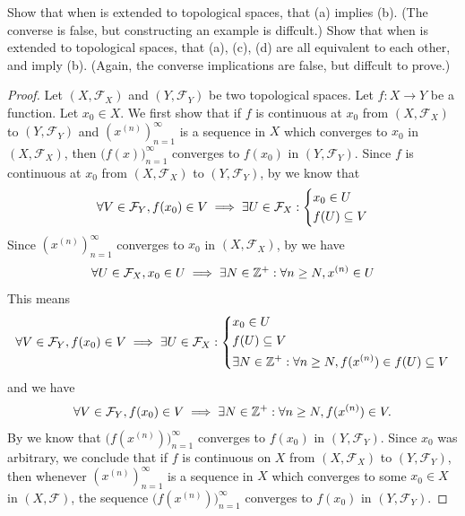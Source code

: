 \begin{ex}\label{ii:ex:2.5.16}
  Show that when  is extended to topological spaces, that (a) implies (b).
  (The converse is false, but constructing an example is diffcult.)
  Show that when  is extended to topological spaces, that (a), (c), (d) are all equivalent to each other, and imply (b).
  (Again, the converse implications are false, but diffcult to prove.)
\end{ex}

\begin{proof}
  Let \((X, \mathcal{F}_X)\) and \((Y, \mathcal{F}_Y)\) be two topological spaces.
  Let \(f : X \to Y\) be a function.
  Let \(x_0 \in X\).
  We first show that if \(f\) is continuous at \(x_0\) from \((X, \mathcal{F}_X)\) to \((Y, \mathcal{F}_Y)\) and \((x^{(n)})_{n = 1}^\infty\) is a sequence in \(X\) which converges to \(x_0\) in \((X, \mathcal{F}_X)\), then \(\big(f(x)\big)_{n = 1}^\infty\) converges to \(f(x_0)\) in \((Y, \mathcal{F}_Y)\).
  Since \(f\) is continuous at \(x_0\) from \((X, \mathcal{F}_X)\) to \((Y, \mathcal{F}_Y)\), by  we know that
  \[
    \forall V \in \mathcal{F}_Y, f(x_0) \in V \implies \exists U \in \mathcal{F}_X : \begin{dcases}
      x_0 \in U \\
      f(U) \subseteq V
    \end{dcases}
  \]
  Since \((x^{(n)})_{n = 1}^\infty\) converges to \(x_0\) in \((X, \mathcal{F}_X)\), by  we have
  \[
    \forall U \in \mathcal{F}_X, x_0 \in U \implies \exists N \in \mathbb{Z}^+ : \forall n \geq N, x^{(n)} \in U
  \]
  This means
  \[
    \forall V \in \mathcal{F}_Y, f(x_0) \in V \implies \exists U \in \mathcal{F}_X : \begin{dcases}
      x_0 \in U        \\
      f(U) \subseteq V \\
      \exists N \in \mathbb{Z}^+ : \forall n \geq N, f(x^{(n)}) \in f(U) \subseteq V
    \end{dcases}
  \]
  and we have
  \[
    \forall V \in \mathcal{F}_Y, f(x_0) \in V \implies \exists N \in \mathbb{Z}^+ : \forall n \geq N, f(x^{(n)}) \in V.
  \]
  By  we know that \(\big(f(x^{(n)})\big)_{n = 1}^\infty\) converges to \(f(x_0)\) in \((Y, \mathcal{F}_Y)\).
  Since \(x_0\) was arbitrary, we conclude that if \(f\) is continuous on \(X\) from \((X, \mathcal{F}_X)\) to \((Y, \mathcal{F}_Y)\), then whenever \((x^{(n)})_{n = 1}^\infty\) is a sequence in \(X\) which converges to some \(x_0 \in X\) in \((X, \mathcal{F})\), the sequence \(\big(f(x^{(n)})\big)_{n = 1}^\infty\) converges to \(f(x_0)\) in \((Y, \mathcal{F}_Y)\).


\end{proof}
